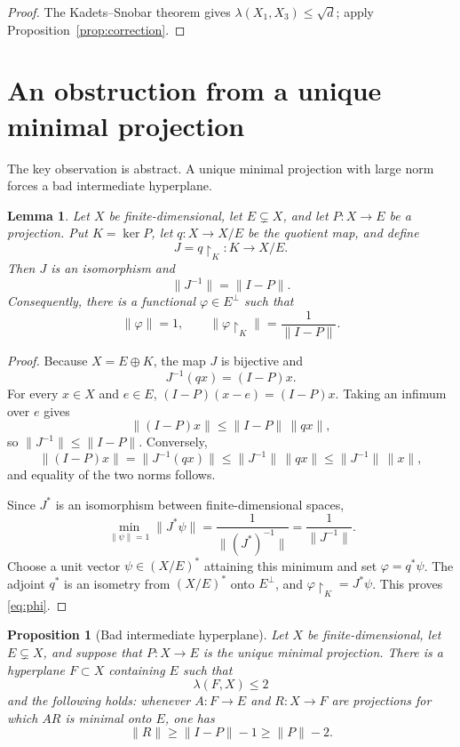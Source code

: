 \documentclass[11pt]{article}
\newtheorem{proposition}[theorem]{Proposition}
\newtheorem{lemma}[theorem]{Lemma}
\theoremstyle{remark}
\newcommand{\Id}{I}
\newcommand{\restr}[2]{#1\!\restriction_{#2}}
\begin{document}
\begin{proof}
The Kadets--Snobar theorem \cite{KadetsSnobar} gives $\lambda(X_1,X_3)\leq\sqrt d$; apply
Proposition~\ref{prop:correction}.
\end{proof}

\section{An obstruction from a unique minimal projection}
\label{sec:obstruction}

The key observation is abstract.  A unique minimal projection with large norm
forces a bad intermediate hyperplane.

\begin{lemma}\label{lem:quotient}
Let $X$ be finite-dimensional, let $E\subsetneq X$, and let $P:X\to E$ be a
projection.  Put $K=\ker P$, let $q:X\to X/E$ be the quotient map, and define
\[
       J=\restr{q}{K}:K\longrightarrow X/E.
\]
Then $J$ is an isomorphism and
\[
       \|J^{-1}\|=\|\Id-P\|.
\]
Consequently, there is a functional $\varphi\in E^\perp$ such that
\begin{equation}\label{eq:phi}
       \|\varphi\|=1,
       \qquad
       \bigl\|\restr{\varphi}{K}\bigr\|
       =\frac{1}{\|\Id-P\|}.
\end{equation}
\end{lemma}

\begin{proof}
Because $X=E\oplus K$, the map $J$ is bijective and
\[
       J^{-1}(q x)=(\Id-P)x.
\]
For every $x\in X$ and $e\in E$,
$(\Id-P)(x-e)=(\Id-P)x$.  Taking an infimum over $e$ gives
\[
 \|(\Id-P)x\|\leq \|\Id-P\|\,\|qx\|,
\]
so $\|J^{-1}\|\leq\|\Id-P\|$.  Conversely,
\[
 \|(\Id-P)x\|=\|J^{-1}(qx)\|
 \leq \|J^{-1}\|\,\|qx\|
 \leq \|J^{-1}\|\,\|x\|,
\]
and equality of the two norms follows.

Since $J^*$ is an isomorphism between finite-dimensional spaces,
\[
 \min_{\|\psi\|=1}\|J^*\psi\|
   =\frac{1}{\|(J^*)^{-1}\|}
   =\frac{1}{\|J^{-1}\|}.
\]
Choose a unit vector $\psi\in(X/E)^*$ attaining this minimum and set
$\varphi=q^*\psi$.  The adjoint $q^*$ is an isometry from $(X/E)^*$ onto
$E^\perp$, and $\restr{\varphi}{K}=J^*\psi$.  This proves
\eqref{eq:phi}.
\end{proof}

\begin{proposition}[Bad intermediate hyperplane]\label{prop:hyperplane}
Let $X$ be finite-dimensional, let $E\subsetneq X$, and suppose that
$P:X\to E$ is the unique minimal projection.  There is a hyperplane
$F\subset X$ containing $E$ such that
\[
       \lambda(F,X)\leq 2
\]
and the following holds: whenever $A:F\to E$ and $R:X\to F$ are projections
for which $AR$ is minimal onto $E$, one has
\begin{equation}\label{eq:badR}
       \|R\|\geq \|\Id-P\|-1\geq \|P\|-2.
\end{equation}
\end{proposition}
\end{document}
